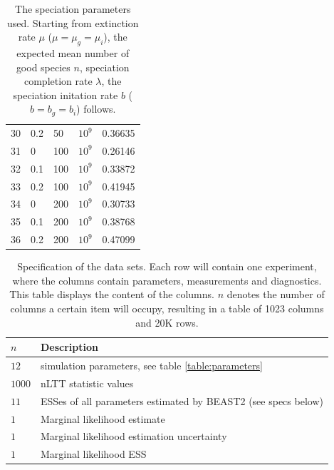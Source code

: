 \begin{table}
\begin{tabular}{|l|l|l|l|l|}
    30 & 0.2 & 50  & $10^9$ & 0.36635 \\
    31 & 0   & 100 & $10^9$ & 0.26146 \\
    32 & 0.1 & 100 & $10^9$ & 0.33872 \\
    33 & 0.2 & 100 & $10^9$ & 0.41945 \\
    34 & 0   & 200 & $10^9$ & 0.30733 \\
    35 & 0.1 & 200 & $10^9$ & 0.38768 \\
    36 & 0.2 & 200 & $10^9$ & 0.47099 \\
    \hline
  \end{tabular}
  \caption{
    The speciation parameters used. Starting from extinction rate $\mu$ ($\mu = \mu_g = \mu_i$), the expected
    mean number of good species $n$, speciation completion rate $\lambda$, the speciation initation
    rate $b$ ($b = b_g = b_i$) follows.  
  }
  \label{table:pbd_parameters}
\end{table}

\begin{table}
  \centering 
  \begin{tabular}{l l}
    \hline
    $n$ & Description \\
    \hline
    \hline
    $12$   & simulation parameters, see table \ref{table:parameters} \\
    $1000$ & nLTT statistic values \\
    $11$ & ESSes of all parameters estimated by BEAST2 (see specs below) \\
    $1$ & Marginal likelihood estimate \\
    $1$ & Marginal likelihood estimation uncertainty \\
    $1$ & Marginal likelihood ESS \\
    \hline
  \end{tabular}
  \caption{
    Specification of the data sets. Each row will contain one experiment,
    where the columns contain parameters, measurements and diagnostics.
    This table displays the content of the columns. 
    $n$ denotes the number
    of columns a certain item will occupy, resulting in a table of 
    1023  columns and 20K rows.
  }
  \label{table:specs}
\end{table}

